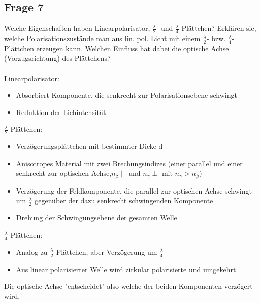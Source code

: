 \documentclass[a4paper,10pt]{scrartcl}
\begin{document}
		\subsection{Frage 7}
			Welche Eigenschaften haben Linearpolarisator, \(\frac{\lambda}{2}\)- und \(\frac{\lambda}{4}\)-Plättchen? Erklären sie, welche
			Polarisationszustände man aus lin. pol. Licht mit einem \(\frac{\lambda}{2}\)- bzw. \(\frac{\lambda}{4}\)-Plättchen erzeugen kann.
			Welchen Einfluss hat dabei die optische Achse (Vorzugsrichtung) des Plättchens?\\
			\\
			Linearpolarisator:
			\begin{itemize}
				\item Absorbiert Komponente, die senkrecht zur Polarisationsebene schwingt
				\item Reduktion der Lichintensität
			\end{itemize}
			
			\(\frac{\lambda}{2}\)-Plättchen:
			\begin{itemize}
				\item Verzögerungsplättchen mit bestimmter Dicke d
				\item Anisotropes Material mit zwei Brechungsindizes (einer parallel und einer senkrecht zur optischen Achse,\(n_{\beta}\parallel\) und \(n_{\gamma}\perp\) mit \(n_{\gamma}>n_{\beta}\))
				\item Verzögerung der Feldkomponente, die parallel zur optischen Achse schwingt um \(\frac{\lambda}{2}\) gegenüber der dazu senkrecht schwingenden Komponente
				\item Drehung der Schwingungsebene der gesamten Welle
			\end{itemize}
		
			\(\frac{\lambda}{4}\)-Plättchen:
			\begin{itemize}
				\item Analog zu \(\frac{\lambda}{2}\)-Plättchen, aber Verzögerung um \(\frac{\lambda}{4}\)
				\item Aus linear polarisierter Welle wird zirkular polarisierte und umgekehrt
			\end{itemize}
		
			Die optische Achse "entscheidet" also welche der beiden Komponenten verzögert wird.
			
\end{document}
